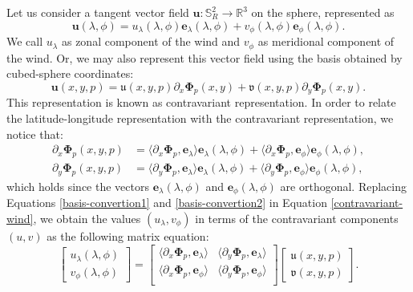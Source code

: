 Let us consider a tangent vector field $\boldsymbol{u}: \mathbb{S}^2_R \to 
\mathbb{R}^3$ on the sphere, represented as
\begin{equation}
	\label{latlon-wind}
	\boldsymbol{u}(\lambda, \phi) = 
	u_{\lambda} (\lambda, \phi) \boldsymbol{e}_{\lambda} (\lambda, \phi) + 
	v_{\phi} (\lambda, \phi) \boldsymbol{e}_{\phi} (\lambda, \phi). 
\end{equation}
We call $u_{\lambda}$ as zonal component of the wind and $v_{\phi}$ as meridional component of the wind.
Or, we may also represent this vector field using the basis 
obtained by cubed-sphere coordinates:
\begin{equation}
	\label{contravariant-wind}
	\boldsymbol{u}(x, y, p) = 
	\mathfrak{u}(x, y, p) \partial_x\boldsymbol{\Phi}_p(x, y) + 
	\mathfrak{v}(x, y, p) \partial_y\boldsymbol{\Phi}_p(x, y).
\end{equation}
This representation is known as contravariant representation.
In order to relate the latitude-longitude representation
with the contravariant representation, we notice that:
\begin{align}
	\label{basis-convertion1}
	\partial_x\boldsymbol{\Phi}_p(x, y, p) &= 
	\langle \partial_x\boldsymbol{\Phi}_p , \boldsymbol{e}_{\lambda}\rangle
	\boldsymbol{e}_{\lambda} (\lambda, \phi)  
	+ \langle 	\partial_x\boldsymbol{\Phi}_p , \boldsymbol{e}_{\phi}\rangle
	\boldsymbol{e}_{\phi} (\lambda, \phi), \\
	\label{basis-convertion2}
	\partial_y\boldsymbol{\Phi}_p(x, y, p) &=  
	\langle \partial_y\boldsymbol{\Phi}_p , \boldsymbol{e}_{\lambda}\rangle
	\boldsymbol{e}_{\lambda} (\lambda, \phi) 
	+ \langle \partial_y\boldsymbol{\Phi}_p , \boldsymbol{e}_{\phi}\rangle
	\boldsymbol{e}_{\phi} (\lambda, \phi), 
\end{align}
which holds since the vectors $\boldsymbol{e}_{\lambda}(\lambda, \phi)$ and
$\boldsymbol{e}_{\phi}(\lambda, \phi)$ are orthogonal.
Replacing Equations \eqref{basis-convertion1} and \eqref{basis-convertion2}
in Equation \eqref{contravariant-wind}, we obtain the values $(u_\lambda, v_\phi)$
in terms of the contravariant components $({u},{v})$ 
as the following matrix equation:
\begin{equation}
	\label{ll-to-contravariant}
	\begin{bmatrix}
		u_\lambda (\lambda, \phi) \\
		v_\phi (\lambda, \phi) 
	\end{bmatrix}
	=
	\begin{bmatrix}
		\langle 	\partial_x\boldsymbol{\Phi}_p, \boldsymbol{e}_\lambda \rangle 
		& \langle 	\partial_y\boldsymbol{\Phi}_p, \boldsymbol{e}_\lambda \rangle \\
		\langle 	\partial_x\boldsymbol{\Phi}_p, \boldsymbol{e}_\phi \rangle 
		& \langle 	\partial_y\boldsymbol{\Phi}_p, \boldsymbol{e}_\phi \rangle \\
	\end{bmatrix}
	\begin{bmatrix}
		\mathfrak{u}(x,y,p) \\
		\mathfrak{v}(x,y,p)
	\end{bmatrix}.
\end{equation}
